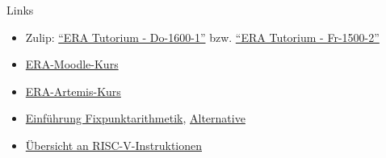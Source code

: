 \documentclass[
  german,            %
  aspectratio=169,    %
]{tumbeamer}
\begin{document}
\begin{frame}[fragile, c]{Links}{}
  \begin{itemize}
    \item Zulip: \href{https://zulip.in.tum.de/#narrow/stream/2661-ERA-Tutorium---Do-1600-1}{\enquote{ERA Tutorium - Do-1600-1}}
          bzw. \href{https://zulip.in.tum.de/#narrow/stream/2675-ERA-Tutorium---Fr-1500-2 }{\enquote{ERA Tutorium - Fr-1500-2}}
    \item \href{https://www.moodle.tum.de/course/view.php?id=100633}{ERA-Moodle-Kurs}
    \item \href{https://artemis.in.tum.de/courses/401}{ERA-Artemis-Kurs}
    \item \href{https://vanhunteradams.com/FixedPoint/FixedPoint.html}{Einführung Fixpunktarithmetik}, \href{https://specbranch.com/posts/fixed-point/}{Alternative}
    \item \href{https://msyksphinz-self.github.io/riscv-isadoc/html/index.html}{Übersicht an RISC-V-Instruktionen}
  \end{itemize}
\end{frame}

\maketitle
\end{document}
